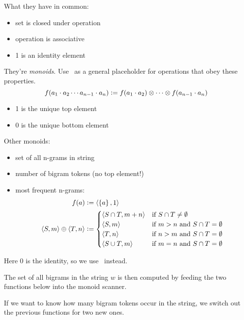 What they have in common:
%
\begin{itemize}
    \item set is closed under operation
    \item operation is associative
    \item 1 is an identity element
\end{itemize}
%
They're \emph{monoids}.
Use \semimult\ as a general placeholder for operations that obey these properties.
%
\[
    f(a_1 \cdot a_2 \cdots a_{n-1} \cdot a_n) \mathrel{\mathop:}=
        f(a_1 \cdot a_2) \otimes \cdots \otimes f(a_{n-1} \cdot a_n)
\]
%
\begin{itemize}
    \item 1 is the unique top element
    \item 0 is the unique bottom element
\end{itemize}
%
Other monoids:
%
\begin{itemize}
    \item set of all n-grams in string
    \item number of bigram tokens (no top element!)
    \item most frequent n-grams:
        \begin{align*}
            f(a)
            & \mathrel{\mathop:}=
            \left \langle \left \{ a \right \},1 \right \rangle 
            \\
            \left \langle S,m \right \rangle  \oplus \left \langle T,n \right \rangle 
            & \mathrel{\mathop:}=
                \begin{cases}
                    \left \langle S \cap T, m+n \right \rangle  & \text{if } S \cap T \neq \emptyset\\
                    \left \langle S,m \right \rangle            & \text{if } m > n \text{ and } S \cap T = \emptyset\\
                    \left \langle T,n \right \rangle            & \text{if } n > m \text{ and } S \cap T = \emptyset\\
                    \left \langle S \cup T, m \right \rangle    & \text{if } m = n \text{ and } S \cap T = \emptyset\\
                \end{cases}
        \end{align*}
\end{itemize}
%
Here 0 is the identity, so we use \semiadd\ instead.

%
The set of all bigrams in the string $w$ is then computed by feeding the two functions below into the monoid scanner.

%
If we want to know how many bigram tokens occur in the string, we switch out the previous functions for two new ones.


